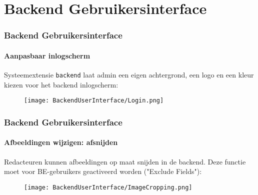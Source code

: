 %

\section{Backend Gebruikersinterface}

\begin{frame}[fragile]
	\frametitle{Backend Gebruikersinterface}
	\framesubtitle{Aanpasbaar inlogscherm}

	Systeemextensie \texttt{backend} laat admin een eigen achtergrond, een logo
	en een kleur kiezen voor het backend inlogscherm:

	\begin{figure}
		\texttt{[image: BackendUserInterface/Login.png]}
	\end{figure}

\end{frame}

\begin{frame}[fragile]
	\frametitle{Backend Gebruikersinterface}
	\framesubtitle{Afbeeldingen wijzigen: afsnijden}

	Redacteuren kunnen afbeeldingen op maat snijden in de backend. Deze functie
	moet voor BE-gebruikers geactiveerd worden ("Exclude Fields"):

	\begin{figure}
		\texttt{[image: BackendUserInterface/ImageCropping.png]}
	\end{figure}

\end{frame}

